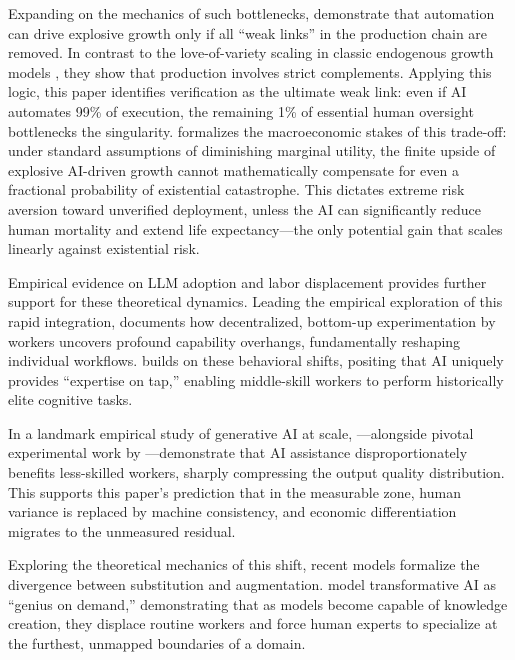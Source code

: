 \documentclass[12pt, letter]{article}
\begin{document}
Expanding on the mechanics of such bottlenecks, \citet{JonesTonetti2026} demonstrate that automation can drive explosive growth only if all ``weak links'' in the production chain are removed. In contrast to the love-of-variety scaling in classic endogenous growth models \citep{Romer90}, they show that production involves strict complements. Applying this logic, this paper identifies verification as the ultimate weak link: even if AI automates 99\% of execution, the remaining 1\% of essential human oversight bottlenecks the singularity. \citet{Jones2024AI} formalizes the macroeconomic stakes of this trade-off: under standard assumptions of diminishing marginal utility, the finite upside of explosive AI-driven growth cannot mathematically compensate for even a fractional probability of existential catastrophe. This dictates extreme risk aversion toward unverified deployment, unless the AI can significantly reduce human mortality and extend life expectancy---the only potential gain that scales linearly against existential risk.

Empirical evidence on LLM adoption and labor displacement provides further support for these theoretical dynamics. Leading the empirical exploration of this rapid integration, \citet{Mollick2024} documents how decentralized, bottom-up experimentation by workers uncovers profound capability overhangs, fundamentally reshaping individual workflows. \citet{Autor2024} builds on these behavioral shifts, positing that AI uniquely provides ``expertise on tap,'' enabling middle-skill workers to perform historically elite cognitive tasks. 

In a landmark empirical study of generative AI at scale, \citet{BrynjolfssonLiRaymond2023}---alongside pivotal experimental work by \citet{NoyZhang2023}---demonstrate that AI assistance disproportionately benefits less-skilled workers, sharply compressing the output quality distribution. This supports this paper's prediction that in the measurable zone, human variance is replaced by machine consistency, and economic differentiation migrates to the unmeasured residual. 

Exploring the theoretical mechanics of this shift, recent models formalize the divergence between substitution and augmentation. \citet{AgrawalGansGoldfarbGenius} model transformative AI as ``genius on demand,'' demonstrating that as models become capable of knowledge creation, they displace routine workers and force human experts to specialize at the furthest, unmapped boundaries of a domain. 
\end{document}
